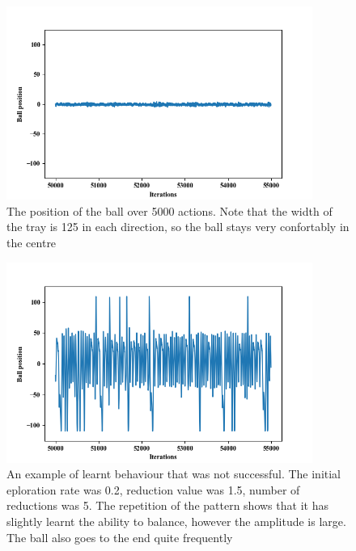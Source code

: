 \documentclass[12pt,a4paper]{article}
\begin{document}
\begin{figure}[H]
	\centering
	\includegraphics[width=10cm]{100_small}
	\caption{The position of the ball over 5000 actions. Note that the width of the tray is 125 in each direction, so the ball stays very confortably in the centre}
	\label{f1}
\end{figure}
\begin{figure}[H]
	\centering
	\includegraphics[width=10cm]{101_small}
	\caption{An example of learnt behaviour that was not successful. The initial eploration rate was 0.2, reduction value was 1.5, number of reductions was 5. The repetition of the pattern shows that it has slightly learnt the ability to balance, however the amplitude is large. The ball also goes to the end quite frequently}
	\label{f2}
\end{figure}
\end{document}
